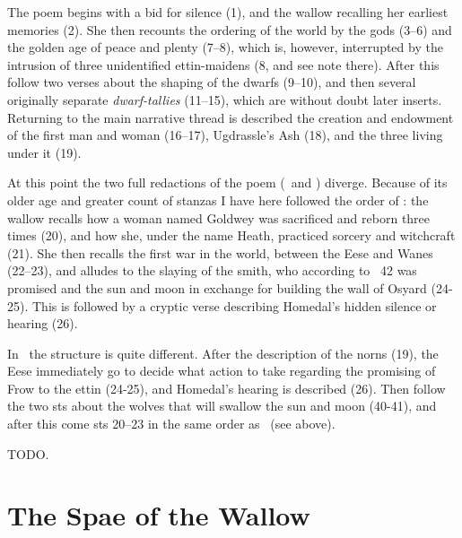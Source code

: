 \sectionline

The poem begins with a bid for silence (1), and the wallow recalling her earliest memories (2). She then recounts the ordering of the world by the gods (3–6) and the golden age of peace and plenty (7–8), which is, however, interrupted by the intrusion of three unidentified ettin-maidens (8, and see note there). After this follow two verses about the shaping of the dwarfs (9–10), and then several originally separate \emph{dwarf-tallies} (11–15), which are without doubt later inserts. Returning to the main narrative thread is described the creation and endowment of the first man and woman (16–17), Ugdrassle’s Ash (18), and the three  living under it (19).

At this point the two full redactions of the poem (\Regius\ and \Hauksbok) diverge. Because of its older age and greater count of stanzas I have here followed the order of \Regius: the wallow recalls how a woman named Goldwey was sacrificed and reborn three times (20), and how she, under the name Heath, practiced sorcery and witchcraft (21). She then recalls the first war in the world, between the Eese and Wanes (22–23), and alludes to the slaying of the smith, who according to \Gylfaginning\ 42 was promised  and the sun and moon in exchange for building the wall of Osyard (24-25). This is followed by a cryptic verse describing Homedal’s hidden silence or hearing (26).

In \Hauksbok\ the structure is quite different. After the description of the norns (19), the Eese immediately go to decide what action to take regarding the promising of Frow to the ettin (24-25), and Homedal’s hearing is described (26). Then follow the two sts about the wolves that will swallow the sun and moon (40-41), and after this come sts 20–23 in the same order as \Regius\ (see above).

TODO.

\sectionline

\newpage

\section{The Spae of the Wallow}

